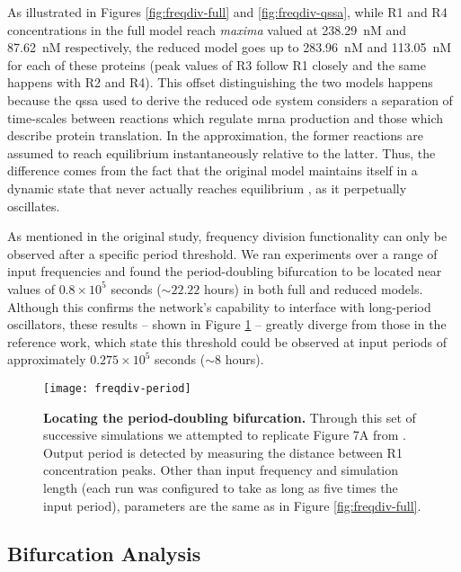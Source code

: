     As illustrated in Figures \ref{fig:freqdiv-full} and \ref{fig:freqdiv-qssa}, while R1 and R4 concentrations in the full model reach \textit{maxima} valued at \SI{238.29}{\nano M} and \SI{87.62}{\nano M} respectively, the reduced model goes up to \SI{283.96}{\nano M} and \SI{113.05}{\nano M} for each of these proteins (peak values of R3 follow R1 closely and the same happens with R2 and R4).
    This offset distinguishing the two models happens because the \ac{qssa} used to derive the reduced \ac{ode} system considers a separation of time-scales between reactions which regulate \acs{mrna} production and those which describe protein translation.
    In the approximation, the former reactions are assumed to reach equilibrium instantaneously relative to the latter.
    Thus, the difference comes from the fact that the original model maintains itself in a dynamic state that never actually reaches equilibrium \cite{ingalls}, as it perpetually oscillates.

    As mentioned in the original study, frequency division functionality can only be observed after a specific period threshold.
    We ran experiments over a range of input frequencies and found the period-doubling bifurcation to be located near values of $0.8 \times 10^5$ seconds ($\sim 22.22$ hours) in both full and reduced models.
    Although this confirms the network's capability to interface with long-period oscillators, these results -- shown in Figure \ref{fig:freqdiv-period} -- greatly diverge from those in the reference work, which state this threshold could be observed at input periods of approximately $0.275 \times 10^5$ seconds ($\sim 8$ hours).

    \begin{figure}[!htb]
      \centering
      \texttt{[image: freqdiv-period]}
      \caption{\textbf{Locating the period-doubling bifurcation.} Through this set of successive simulations we attempted to replicate Figure 7A from \citet{multif}. Output period is detected by measuring the distance between R1 concentration peaks. Other than input frequency and simulation length (each run was configured to take as long as five times the input period), parameters are the same as in Figure \ref{fig:freqdiv-full}.}
      \label{fig:freqdiv-period}
    \end{figure}


  \subsection{Bifurcation Analysis}

